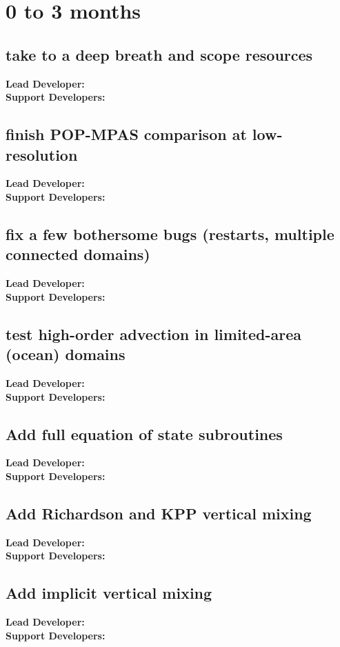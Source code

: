 \section{0 to 3 months}
\subsection{take to a deep breath and scope resources}
{\bf Lead Developer:  } \\
{\bf Support Developers: } \\
\subsection{finish POP-MPAS comparison at low-resolution}
{\bf Lead Developer:  } \\
{\bf Support Developers: } \\
\subsection{fix a few bothersome bugs (restarts, multiple connected domains)}
{\bf Lead Developer:  } \\
{\bf Support Developers: } \\
\subsection{test high-order advection in limited-area (ocean) domains}
{\bf Lead Developer:  } \\
{\bf Support Developers: } \\
\subsection{Add full equation of state subroutines}
{\bf Lead Developer:  } \\
{\bf Support Developers: } \\
\subsection{Add Richardson and KPP vertical mixing}
{\bf Lead Developer:  } \\
{\bf Support Developers: } \\
\subsection{Add implicit vertical mixing}
{\bf Lead Developer:  } \\
{\bf Support Developers: } \\
